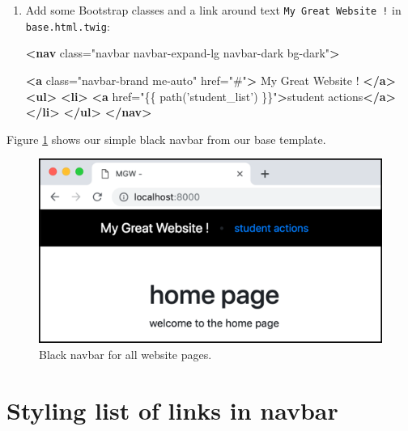 \documentclass[a4paperpaper,openright]{book}
\newenvironment{Shaded}{}{}
\newcommand{\KeywordTok}[1]{\textcolor[rgb]{0.00,0.44,0.13}{\textbf{#1}}}
\newcommand{\NormalTok}[1]{#1}
\newcommand{\OtherTok}[1]{\textcolor[rgb]{0.00,0.44,0.13}{#1}}
\newcommand{\StringTok}[1]{\textcolor[rgb]{0.25,0.44,0.63}{#1}}
\begin{document}
\begin{enumerate}
\def\labelenumi{\arabic{enumi}.}
\item
  Add some Bootstrap classes and a link around text
  \texttt{My\ Great\ Website\ !} in \texttt{base.html.twig}:

\begin{Shaded}
\begin{Highlighting}[]
       \KeywordTok{<nav}\OtherTok{ class=}\StringTok{"navbar navbar-expand-lg navbar-dark bg-dark"}\KeywordTok{>}

           \KeywordTok{<a}\OtherTok{ class=}\StringTok{"navbar-brand me-auto"}\OtherTok{ href=}\StringTok{"#"}\KeywordTok{>}
\NormalTok{            My Great Website !}
            \KeywordTok{</a>}
           \KeywordTok{<ul>}
               \KeywordTok{<li>}
                   \KeywordTok{<a}\OtherTok{ href=}\StringTok{"\{\{ path('student_list') \}\}"}\KeywordTok{>}\NormalTok{student actions}\KeywordTok{</a>}
               \KeywordTok{</li>}
           \KeywordTok{</ul>}
       \KeywordTok{</nav>}
\end{Highlighting}
\end{Shaded}
\end{enumerate}

Figure \ref{black_nav} shows our simple black navbar from our base
template.

\begin{figure}
\centering
\includegraphics{./tex2pdf.-8a1528da847c818a/d0d0a0c5c02cdeae130278796b262303df02b576.png}
\caption{Black navbar for all website pages. \label{black_nav}}
\end{figure}

\hypertarget{styling-list-of-links-in-navbar}{%
\section{Styling list of links in
navbar}\label{styling-list-of-links-in-navbar}}
\end{document}
